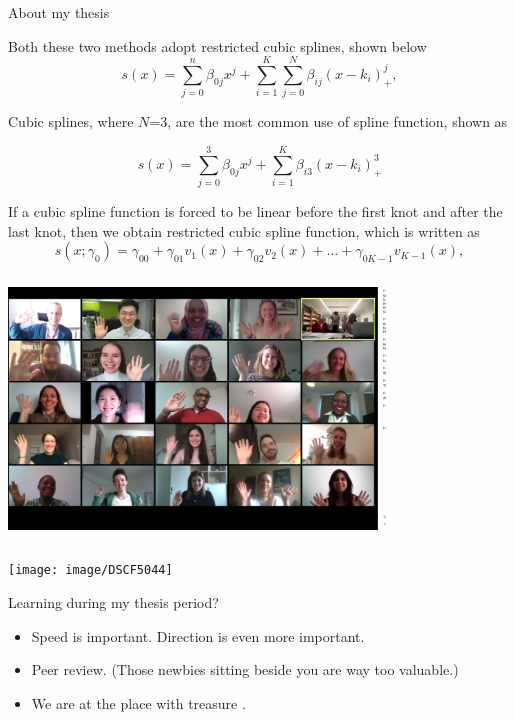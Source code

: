\documentclass{beamer}
\begin{document}
\begin{frame}[allowframebreaks]{About my thesis}

Both these two methods adopt restricted cubic splines, shown below
\begin{equation}
s(x)=\sum_{j=0}^{n} \beta_{0 j} x^{j}+\sum_{i=1}^{K} \sum_{j=0}^{N} \beta_{i j}\left(x-k_{i}\right)_{+}^{j},
\end{equation}

Cubic splines, where $N$=3, are the most common use of spline function,  shown as 

\begin{equation}
s(x)=\sum_{j=0}^{3} \beta_{0 j} x^{j}+\sum_{i=1}^{K} \beta_{i 3}\left(x-k_{i}\right)_{+}^{3}
\end{equation}

If a cubic spline function is forced to be linear before the first knot and after the last knot, then we obtain restricted cubic spline function, which is written as 
\begin{equation}
s\left(x ; \gamma_{0}\right)=\gamma_{00}+\gamma_{01} v_{1}(x)+\gamma_{02} v_{2}(x)+\ldots+\gamma_{0 K-1} v_{K-1}(x),
\end{equation}

\framebreak
\center
\includegraphics[width=10cm,height=7cm]{image/defensephoto}

\framebreak
\center
\texttt{[image: image/DSCF5044]}

\end{frame}

\begin{frame}{Learning during my thesis period?}

\begin{itemize}
	\item <1->  Speed is important. Direction is even more important.
	\item <2-> Peer review. (Those newbies sitting beside you are way too valuable.)
	\item <3-> We are at the place with treasure	.
\end{itemize}
\end{frame}
\end{document}
